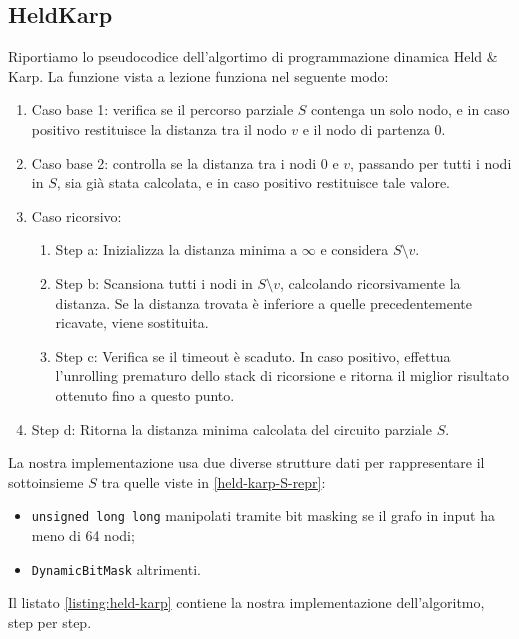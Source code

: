 \subsection{HeldKarp}

Riportiamo lo pseudocodice dell'algortimo di programmazione dinamica Held \& Karp. La funzione  vista a lezione funziona nel seguente modo:

\begin{enumerate}
    \item Caso base 1: verifica se il percorso parziale $S$ contenga un solo nodo, e in caso positivo restituisce la distanza tra il nodo $v$ e il nodo di partenza $0$.
    \item Caso base 2: controlla se la distanza tra i nodi $0$ e $v$, passando per tutti i nodi in $S$, sia già stata calcolata, e in caso positivo restituisce tale valore.
    \item Caso ricorsivo:
    \begin{enumerate}
        \item Step a: Inizializza la distanza minima a $\infty$ e considera $S \setminus {v}$.
        \item Step b: Scansiona tutti i nodi in $S \setminus {v}$, calcolando ricorsivamente la distanza. Se la distanza trovata è inferiore a quelle precedentemente ricavate, viene sostituita.
        \item Step c: Verifica se il timeout è scaduto. In caso positivo, effettua l'unrolling prematuro dello stack di ricorsione e ritorna il miglior risultato ottenuto fino a questo punto.
    \end{enumerate}
    \item Step d: Ritorna la distanza minima calcolata del circuito parziale $S$.
\end{enumerate}

\noindent La nostra implementazione usa due diverse strutture dati per rappresentare il sottoinsieme $S$ tra quelle viste in \ref{held-karp-S-repr}:

\begin{itemize}
    \item \texttt{unsigned long long} manipolati tramite bit masking se il grafo in input ha meno di 64 nodi;
    \item \texttt{DynamicBitMask} altrimenti.
\end{itemize}

\noindent Il listato \ref{listing:held-karp} contiene la nostra implementazione dell'algoritmo, step per step.

